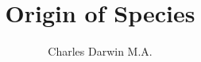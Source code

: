 \documentclass[twocolumn, oneside,12pt]{book}
\begin{document}
\title{Origin of Species}
\author{Charles Darwin M.A.}
\maketitle
\onecolumn
\frontmatter
\dominitoc
\tableofcontents
\twocolumn
%
\mainmatter












\end{document}
